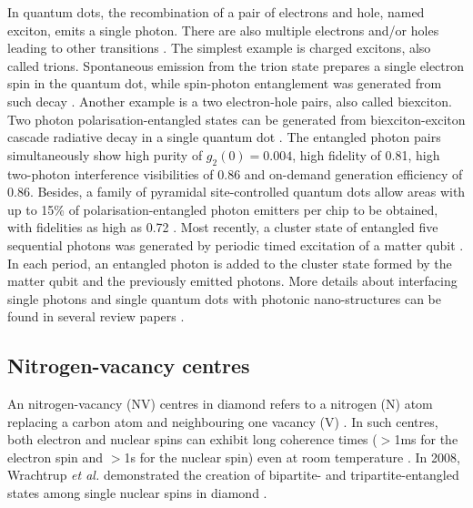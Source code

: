 In quantum dots, the recombination of a pair of electrons and hole, named exciton, emits a single photon. There are also multiple electrons and/or holes leading to other transitions \cite{bib:lodahl2015interfacing}. The simplest example is charged excitons, also called trions. Spontaneous emission from the trion state prepares a single electron spin in the quantum dot, while spin-photon entanglement was generated from such decay \cite{bib:de2012quantum, bib:gao2012observation}. Another example is a two electron-hole pairs, also called biexciton. Two photon polarisation-entangled states can be generated from biexciton-exciton cascade radiative decay in a single quantum dot \cite{bib:muller2014demand}. The entangled photon pairs simultaneously show high purity of \mbox{$g_2(0) = 0.004$}, high fidelity of 0.81, high two-photon interference visibilities of 0.86 and on-demand generation efficiency of 0.86. Besides, a family of pyramidal site-controlled quantum dots allow areas with up to 15\% of polarisation-entangled photon emitters per chip to be obtained, with fidelities as high as 0.72 \cite{bib:juska2013towards, bib:mohan2010polarization}. Most recently, a cluster state of entangled five sequential photons was generated by periodic timed excitation of a matter qubit \cite{bib:schwartz2016deterministic}. In each period, an entangled photon is added to the cluster state formed by the matter qubit and the previously emitted photons. More details about interfacing single photons and single quantum dots with photonic nano-structures can be found in several review papers \cite{bib:de2013ultrafast, bib:urbaszek2013nuclear, bib:lodahl2015interfacing}.

%
%

\subsection{Nitrogen-vacancy centres} 

An nitrogen-vacancy (NV) centres in diamond refers to a nitrogen (N) atom replacing a carbon atom and neighbouring one vacancy (V) \cite{bib:doherty2013nitrogen}. In such centres, both electron and nuclear spins can exhibit long coherence times ($>$1ms for the electron spin and $>$1s for the nuclear spin) even at room temperature \cite{bib:balasubramanian2009ultralong, bib:neumann2010quantum, bib:maurer2012room}. In 2008, Wrachtrup \textit{et al.} demonstrated the creation of bipartite- and tripartite-entangled states among single nuclear spins in diamond \cite{bib:neumann2008multipartite}.

